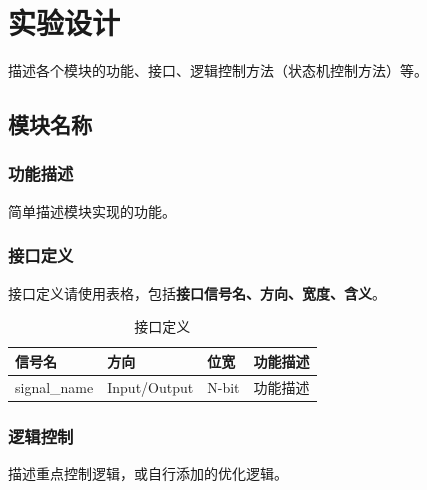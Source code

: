 \section{实验设计}

描述各个模块的功能、接口、逻辑控制方法（状态机控制方法）等。

\subsection{模块名称}\label{sub:module}
\subsubsection{功能描述}
简单描述模块实现的功能。

\subsubsection{接口定义}
接口定义请使用表格，包括\textbf{接口信号名、方向、宽度、含义}。

\begin{table}[htp]
\caption{接口定义}\label{tab:signaldef}
\begin{center}
    \begin{tabular}{|l|l|l|p{6cm}|}
    \hline
    \textbf{信号名} & \textbf{方向} & \textbf{位宽} & \textbf{功能描述}\\ \hline \hline
    signal\_name & Input/Output & N-bit & 功能描述 \\
    \hline
    \end{tabular}
\end{center}
\end{table}

\subsubsection{逻辑控制}
描述重点控制逻辑，或自行添加的优化逻辑。
